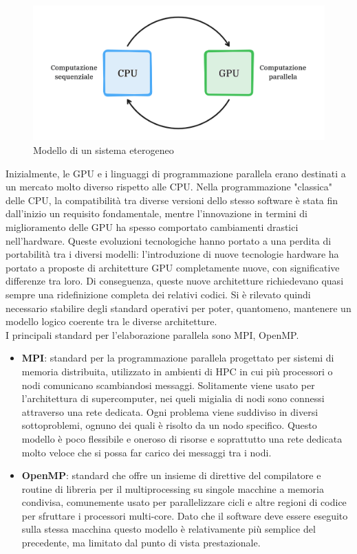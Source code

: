 \begin{figure}[ht]
    \centering
    \includegraphics[width=.9\linewidth]{images/chapter2/het_model2.png}
    \caption{Modello di un sistema eterogeneo}
    \label{fig:het_model}
\end{figure}


Inizialmente, le GPU e i linguaggi di programmazione parallela erano destinati a un mercato molto diverso rispetto alle CPU. Nella programmazione "classica" delle CPU, la compatibilità tra diverse versioni dello stesso software è stata fin dall'inizio un requisito fondamentale, mentre l'innovazione in termini di miglioramento delle GPU ha spesso comportato cambiamenti drastici nell'hardware. Queste evoluzioni tecnologiche hanno portato a una perdita di portabilità tra i diversi modelli: l'introduzione di nuove tecnologie hardware ha portato a proposte di architetture GPU completamente nuove, con significative differenze tra loro. Di conseguenza, queste nuove architetture richiedevano quasi sempre una ridefinizione completa dei relativi codici. Si è rilevato quindi necessario stabilire degli standard operativi per poter, quantomeno, mantenere un modello logico coerente tra le diverse architetture.
\\
I principali standard per l'elaborazione parallela sono MPI, OpenMP.

\begin{itemize}
    \item \textbf{MPI}: standard per la programmazione parallela progettato per sistemi di memoria distribuita, utilizzato in ambienti di HPC in cui più processori o nodi comunicano scambiandosi messaggi. Solitamente viene usato per l'architettura di supercomputer, nei queli migialia di nodi sono connessi attraverso una rete dedicata. Ogni problema viene suddiviso in diversi sottoproblemi, ognuno dei quali è risolto da un nodo specifico. Questo modello è poco flessibile e oneroso di risorse e soprattutto una rete dedicata molto veloce che si possa far carico dei messaggi tra i nodi.
    \item \textbf{OpenMP}: standard che offre un insieme di direttive del compilatore e routine di libreria per il multiprocessing su singole macchine a memoria condivisa, comunemente usato per parallelizzare cicli e altre regioni di codice per sfruttare i processori multi-core. Dato che il software deve essere eseguito sulla stessa macchina questo modello è relativamente più semplice del precedente, ma limitato dal punto di vista prestazionale.
\end{itemize}

